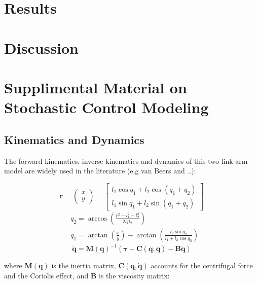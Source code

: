 \section{Results}
\section{Discussion}

\section{Supplimental Material on Stochastic Control Modeling}
\label{app:oc}

\subsection{Kinematics and Dynamics}
\label{app:kindyn}
The forward kinematics, inverse kinematics and dynamics of this two-link arm model are widely used in the literature (e.g van Beers and ..):

\begin{equation}
\bm{r} =\left(\begin{matrix} x\\y \end{matrix}\right) %
= \left[ \begin{matrix}  l_1\cos{q_1} + l_2\cos{(q_1+q_2)} \\ l_1\sin{q_1} + l_2\sin{(q_1+q_2)}  \end{matrix} \right]
\end{equation}
\begin{equation}
\begin{split}
& q_2 = \arccos{\left(\frac{r^2-l_1^2-l_2^2}{2l_1l_2}\right)} \\
& q_1 = \arctan{\left( \frac{x}{y} \right)} - \arctan{\left(\frac{l_2\sin{q_2}}{l_1+l_2\cos q_2 }\right)}
\end{split}
\end{equation}
\begin{equation} \label{dynamics}
\ddot{\bm{q}} = \bm{M}(\bm{q})^{-1} (\bm{\tau} - \bm{C}(\bm{q}, \dot{\bm{q}}) - \bm{B}\dot{\bm{q}})
\end{equation}

where $\bm{M}(\bm{q})$ is the inertia matrix, $\bm{C}(\bm{q}, \dot{\bm{q}})$ accounts for the centrifugal force and the Coriolis effect, and $\bm{B}$ is the viscosity matrix:


